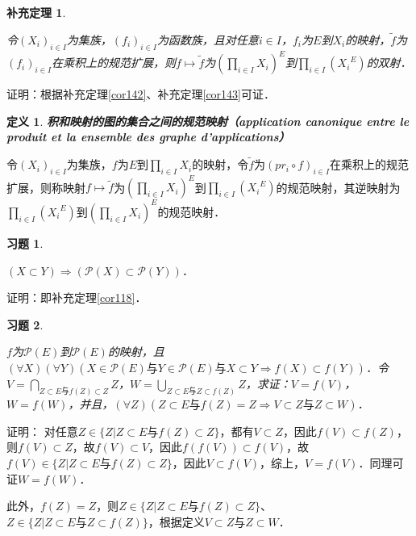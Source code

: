 \documentclass[12pt, a4paper, oneside]{book}
\newtheorem{cor}{补充定理}
\newtheorem{de}{定义}
\newtheorem{exer}{习题}
\begin{document}
			\begin{cor}\label{cor144}
				\hfill\par
				令$(X_i)_{i\in I}$为集族，$(f_i)_{i\in I}$为函数族，且对任意$i\in I$，$f_i$为$E$到$X_i$的映射，$\tilde{f}$为$(f_i)_{i\in I}$在乘积上的规范扩展，则$f\mapsto \tilde{f}$为$(\prod\limits_{i\in I}X_i)^E$到$\prod\limits_{i\in I}({X_i}^E)$的双射．
			\end{cor}
			证明：根据补充定理\ref{cor142}、补充定理\ref{cor143}可证．

			\begin{de}
				\textbf{积和映射的图的集合之间的规范映射（application canonique entre le produit et la ensemble des graphe d'applications）}
			\end{de}			
			令$(X_i)_{i\in I}$为集族，$f$为$E$到$\prod\limits_{i\in I}X_i$的映射，令$\tilde{f}$为$(pr_i\circ f)_{i\in I}$在乘积上的规范扩展，则称映射$f\mapsto \tilde{f}$为$(\prod\limits_{i\in I}X_i)^E$到$\prod\limits_{i\in I}({X_i}^E)$的规范映射，其逆映射为$\prod\limits_{i\in I}({X_i}^E)$到$(\prod\limits_{i\in I}X_i)^E$的规范映射．			
			
			\begin{exer}\label{exer62}
				\hfill\par
				$(X\subset Y)\Rightarrow( \mathcal{P}(X)\subset \mathcal{P}(Y))$．
			\end{exer}
			证明：即补充定理\ref{cor118}．
			
			\begin{exer}\label{exer63}
				\hfill\par
				$f$为$\mathcal{P}(E)$到$\mathcal{P}(E)$的映射，且$(\forall X)(\forall Y)(X\in \mathcal{P}(E)\text{与}Y\in \mathcal{P}(E)\text{与}X\subset Y\Rightarrow f(X)\subset f(Y))$．令$V=\bigcap\limits_{Z\subset E\text{与}f(Z)\subset Z}Z$，$W=\bigcup\limits_{Z\subset E\text{与}Z\subset f(Z)}Z$，求证：$V=f(V)$，$W=f(W)$，并且，$(\forall Z)(Z\subset E\text{与}f(Z)=Z\Rightarrow V\subset Z\text{与}Z\subset W)$．
			\end{exer}
			证明：
			对任意$Z\in \{Z|Z\subset E\text{与}f(Z)\subset Z\}$，都有$V\subset Z$，因此$f(V)\subset f(Z)$，则$f(V)\subset Z$，故$f(V)\subset V$，因此$f(f(V))\subset f(V)$，故 $f(V)\in \{Z|Z\subset E\text{与}f(Z)\subset Z\}$，因此$V\subset f(V)$，综上，$V=f(V)$．同理可证$W=f(W)$．
			\par
			此外，$f(Z)=Z$，则$Z\in \{Z|Z\subset E\text{与}f(Z)\subset Z\}$、$Z\in \{Z|Z\subset E\text{与}Z\subset f(Z)\}$，根据定义$V\subset Z\text{与}Z\subset W$．
			
\end{document}
